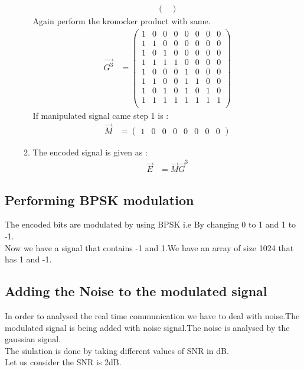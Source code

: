 \documentclass[journal,5pt,twocolumn]{IEEEtran}
\begin{document}
\begin{enumerate}
\begin{enumerate}
\begin{align}
\begin{pmatrix}
\end{pmatrix}
\end{align}
Again perform the kronocker product with same.\\
\begin{align}
\vec{G^3}&=
\begin{pmatrix}
1 & 0 & 0 & 0 & 0 & 0 & 0 & 0 \\
1 & 1 & 0 & 0 & 0 & 0 & 0 & 0 \\
1 & 0 & 1 & 0 & 0 & 0 & 0 & 0 \\
1 & 1 & 1 & 1 & 0 & 0 & 0 & 0 \\
1 & 0 & 0 & 0 & 1 & 0 & 0 & 0 \\
1 & 1 & 0 & 0 & 1 & 1 & 0 & 0 \\
1 & 0 & 1 & 0 & 1 & 0 & 1 & 0 \\
1 & 1 & 1 & 1 & 1 & 1 & 1 & 1 \\
\end{pmatrix}
\end{align}
If manipulated signal came step 1 is :
\begin{align}
\vec{M}&=
\begin{pmatrix}
1 & 0 & 0 & 0 & 0 & 0 & 0 & 0 
\end{pmatrix}
\end{align}
\item The encoded signal is given as :\\
\begin{align}
\vec{E}&=\vec{M}\vec{G}^3
\end{align}
\end{enumerate}
\end{enumerate}
\subsection{\textbf{Performing BPSK modulation}}
The encoded bits are modulated by using BPSK i.e By changing 0 to 1 and 1 to -1. \\
Now we have a signal that contains -1 and 1.We have an array of size 1024 that has 1 and -1.
\subsection{\textbf{Adding the Noise to the modulated signal}}
In order to analysed the real time communication we have to deal with noise.The modulated signal is being added with noise signal.The noise is analysed by the gaussian signal.\\
The siulation is done by taking different values of SNR in dB.\\
Let us consider the SNR is 2dB.
\end{document}
